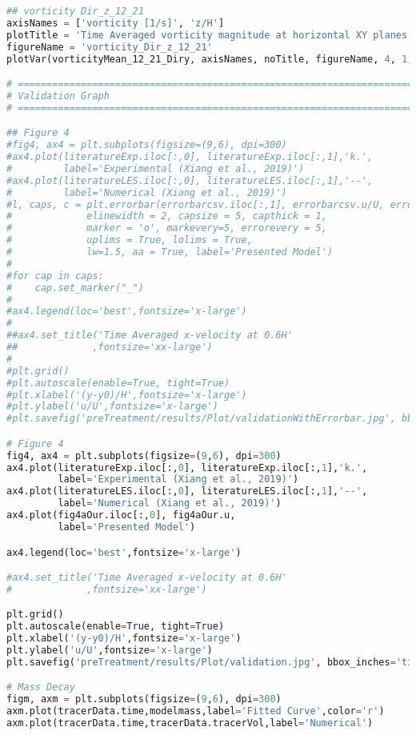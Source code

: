 \begin{lstlisting}[language=python]
## vorticity Dir_z_12_21
axisNames = ['vorticity [1/s]', 'z/H']
plotTitle = 'Time Averaged vorticity magnitude at horizontal XY planes'
figureName = 'vorticity_Dir_z_12_21'
plotVar(vorticityMean_12_21_Diry, axisNames, noTitle, figureName, 4, 1, 12, 21)

# =============================================================================
# Validation Graph
# =============================================================================

## Figure 4
#fig4, ax4 = plt.subplots(figsize=(9,6), dpi=300)
#ax4.plot(literatureExp.iloc[:,0], literatureExp.iloc[:,1],'k.',
#         label='Experimental (Xiang et al., 2019)')
#ax4.plot(literatureLES.iloc[:,0], literatureLES.iloc[:,1],'--',
#         label='Numerical (Xiang et al., 2019)')
#l, caps, c = plt.errorbar(errorbarcsv.iloc[:,1], errorbarcsv.u/U, errorbarcsv.iloc[:,9]/U,
#             elinewidth = 2, capsize = 5, capthick = 1,
#             marker = 'o', markevery=5, errorevery = 5,
#             uplims = True, lolims = True, 
#             lw=1.5, aa = True, label='Presented Model')
#
#for cap in caps:
#    cap.set_marker("_")
#
#ax4.legend(loc='best',fontsize='x-large')
#   
##ax4.set_title('Time Averaged x-velocity at 0.6H'
##             ,fontsize='xx-large')
#
#plt.grid()
#plt.autoscale(enable=True, tight=True)
#plt.xlabel('(y-y0)/H',fontsize='x-large')
#plt.ylabel('u/U',fontsize='x-large')
#plt.savefig('preTreatment/results/Plot/validationWithErrorbar.jpg', bbox_inches='tight')

# Figure 4
fig4, ax4 = plt.subplots(figsize=(9,6), dpi=300)
ax4.plot(literatureExp.iloc[:,0], literatureExp.iloc[:,1],'k.',
         label='Experimental (Xiang et al., 2019)')
ax4.plot(literatureLES.iloc[:,0], literatureLES.iloc[:,1],'--',
         label='Numerical (Xiang et al., 2019)')
ax4.plot(fig4aOur.iloc[:,0], fig4aOur.u,
         label='Presented Model')

ax4.legend(loc='best',fontsize='x-large')

#ax4.set_title('Time Averaged x-velocity at 0.6H'
#             ,fontsize='xx-large')

plt.grid()
plt.autoscale(enable=True, tight=True)
plt.xlabel('(y-y0)/H',fontsize='x-large')
plt.ylabel('u/U',fontsize='x-large')
plt.savefig('preTreatment/results/Plot/validation.jpg', bbox_inches='tight')

# Mass Decay
figm, axm = plt.subplots(figsize=(9,6), dpi=300)
axm.plot(tracerData.time,modelmass,label='Fitted Curve',color='r')
axm.plot(tracerData.time,tracerData.tracerVol,label='Numerical')


\end{lstlisting}
